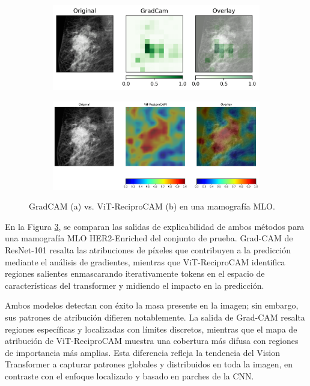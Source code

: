 \documentclass[a4paper,10pt]{book}
\begin{document}
\begin{figure}[h!]
\centering
\begin{subfigure}[c]{0.48\textwidth}
\centering
\includegraphics[width=\textwidth]{reports//assets/D2-0138_MLO-R_Resnet.png}
\caption{}
\label{fig:mlo_grad}
\end{subfigure}
\begin{subfigure}[c]{0.48\textwidth}
\centering
\includegraphics[width=\textwidth]{reports//assets/D2-0138_MLO-R.png}
\caption{}
\label{fig:mlo_reci}
\end{subfigure}
\caption[GradCAM vs. ViT-ReciproCAM (vista MLO)]{GradCAM (a) vs. ViT-ReciproCAM (b) en una mamografía MLO.}
\label{fig:grad_vs_vit}
\end{figure}

En la Figura \ref{fig:grad_vs_vit}, se comparan las salidas de explicabilidad de ambos métodos para una mamografía MLO HER2-Enriched del conjunto de prueba. Grad-CAM de ResNet-101 resalta las atribuciones de píxeles que contribuyen a la predicción mediante el análisis de gradientes, mientras que ViT-ReciproCAM identifica regiones salientes enmascarando iterativamente tokens en el espacio de características del transformer y midiendo el impacto en la predicción.

Ambos modelos detectan con éxito la masa presente en la imagen; sin embargo, sus patrones de atribución difieren notablemente. La salida de Grad-CAM resalta regiones específicas y localizadas con límites discretos, mientras que el mapa de atribución de ViT-ReciproCAM muestra una cobertura más difusa con regiones de importancia más amplias. Esta diferencia refleja la tendencia del Vision Transformer a capturar patrones globales y distribuidos en toda la imagen, en contraste con el enfoque localizado y basado en parches de la CNN.
\end{document}
